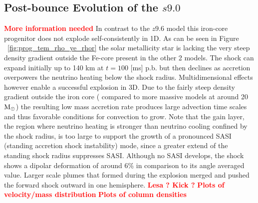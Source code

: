 \documentclass[fleqn,usenatbib]{mnras}
\newcommand{\solm}{\xspace\ensuremath{\rm{M_{\odot}}}\xspace}
\begin{document}
\subsection{Post-bounce Evolution of the $s9.0$}
\textcolor{red}{\textbf{More information needed}}
In contrast to the $z9.6$ model this iron-core progenitor does not explode self-consistently in 1D. As can be seen in Figure ~\ref{fig:prog_tem_rho_ye_rhor} the solar metallicity star is lacking the very steep density gradient outside the Fe-core present in the other 2 models. The shock can expand initially up to 140 km at $t=100$ [ms] p.b. but then declines as accretion overpowers the neutrino heating below the shock radius. 
Multidimensional effects however enable a successful explosion in 3D.  Due to the fairly steep density gradient outside the iron core ( compared to more massive models at around 20\solm) the resulting low mass accretion rate produces large advection time scales and thus favorable conditions for convection to grow. Note that the gain layer, the region where neutrino heating is stronger than neutrino cooling confined by the shock radius,  is too large to support the growth of a pronounced SASI (standing accretion shock instability) mode, since a greater extend of the standing shock radius suppresses SASI. Although no SASI develops, the shock shows a dipolar deformation of around 6\% in comparison to its angle averaged value. Larger scale plumes that formed during the explosion merged and pushed the forward shock outward in one hemisphere. 
\textcolor{red}{\textbf{Lesa ? Kick ?}}
\textcolor{red}{\textbf{Plots of velocity/mass distribution}}
\textcolor{red}{\textbf{Plots of column densities}}
\end{document}
